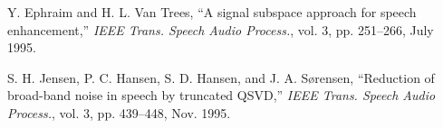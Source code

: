 \documentclass[10pt,pdflatex,headrule,landscape]{beamer}
\begin{document}
\begin{frame}[allowframebreaks]
\begin{thebibliography}{99}
Y. Ephraim and H. L. Van Trees, ``A signal subspace approach for speech enhancement,'' \emph{IEEE Trans. Speech Audio Process.}, vol. 3, pp. 251--266, July 1995.

S. H. Jensen, P. C. Hansen, S. D. Hansen, and J. A. S\o{}rensen, ``Reduction of broad-band noise in speech by truncated QSVD,'' \emph{IEEE Trans. Speech Audio Process.}, vol. 3, pp. 439--448, Nov. 1995.

\end{thebibliography}

\end{frame}
\end{document}
